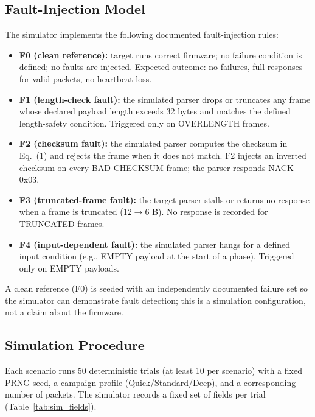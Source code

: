 \documentclass[10pt,letterpaper]{article}
\begin{document}
\subsection{Fault-Injection Model}
The simulator implements the following documented fault-injection rules:
\begin{itemize}
  \item \textbf{F0 (clean reference):} target runs correct firmware; no failure condition is defined; no faults are injected. Expected outcome: no failures, full responses for valid packets, no heartbeat loss.
  \item \textbf{F1 (length-check fault):} the simulated parser drops or truncates any frame whose declared payload length exceeds 32 bytes and matches the defined length-safety condition. Triggered only on OVERLENGTH frames.
  \item \textbf{F2 (checksum fault):} the simulated parser computes the checksum in Eq.~(1) and rejects the frame when it does not match. F2 injects an inverted checksum on every BAD CHECKSUM frame; the parser responds NACK 0x03.
  \item \textbf{F3 (truncated-frame fault):} the target parser stalls or returns no response when a frame is truncated (12$\to$6 B). No response is recorded for TRUNCATED frames.
  \item \textbf{F4 (input-dependent fault):} the simulated parser hangs for a defined input condition (e.g., EMPTY payload at the start of a phase). Triggered only on EMPTY payloads.
\end{itemize}
A clean reference (F0) is seeded with an independently documented failure set so the simulator can demonstrate fault detection; this is a simulation configuration, not a claim about the firmware.

\subsection{Simulation Procedure}
Each scenario runs 50 deterministic trials (at least 10 per scenario) with a fixed PRNG seed, a campaign profile (Quick/Standard/Deep), and a corresponding number of packets. The simulator records a fixed set of fields per trial (Table~\ref{tab:sim_fields}).
\end{document}
